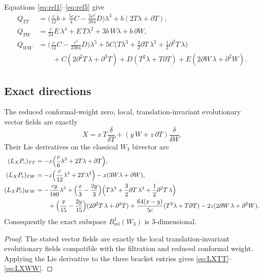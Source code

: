 \begin{remark}
Equations \eqref{eq:rel1}--\eqref{eq:rel5} give
\begin{align*}
Q_{TT}
&=
\Big(\frac c{12}b+\frac{5c}{4}C-\frac{5c^2}{384}D\Big)\lambda^3+b(2T\lambda+\partial T),\\[4pt]
Q_{TW}
&=
\frac c{24}E\,\lambda^4+E\,T\lambda^2+3b\,W\lambda+b\,\partial W,\\[4pt]
Q_{WW}
&=
\Big(\frac c{12}C-\frac{c^2}{2304}D\Big)\lambda^5
+5C\Big(T\lambda^3+\frac32\partial T\,\lambda^2+\frac12\partial^2T\,\lambda\Big)\\
&\qquad
+C(2\partial^2T\,\lambda+\partial^3T)
+D(T^2\lambda+T\partial T)
+E(2\partial W\,\lambda+\partial^2W).
\end{align*}
\end{remark}

\subsection{Exact directions}

\begin{proposition}\label{prop:W3exacts}
The reduced conformal-weight zero, local, translation-invariant evolutionary vector fields
are exactly
\[
X=x\,T\frac{\delta}{\delta T}+(y\,W+z\,\partial T)\frac{\delta}{\delta W}.
\]
Their Lie derivatives on the classical $W_3$ bivector are
\begin{align}
(L_XP_c)_{TT}
&=
-x\Big(\frac c6\lambda^3+2T\lambda+\partial T\Big),\label{eq:LXTT}\\
(L_XP_c)_{TW}
&=
-z\Big(\frac c{12}\lambda^4+2T\lambda^2\Big)-x(3W\lambda+\partial W),\label{eq:LXTW}\\
(L_XP_c)_{WW}
&=
-\frac{cy}{180}\lambda^5
+\Big(\frac x3-\frac{2y}{3}\Big)
\Big(T\lambda^3+\frac32\partial T\,\lambda^2+\frac12\partial^2T\,\lambda\Big)\notag\\
&\qquad
+\Big(\frac x{15}-\frac{2y}{15}\Big)(2\partial^2T\,\lambda+\partial^3T)
+\frac{64(x-y)}{5c}(T^2\lambda+T\partial T)
-2z(2\partial W\,\lambda+\partial^2W).\label{eq:LXWW}
\end{align}
Consequently the exact subspace $B^1_{\mathrm{rel}}(W_3)$ is $3$-dimensional.
\end{proposition}

\begin{proof}
The stated vector fields are exactly the local translation-invariant evolutionary fields
compatible with the filtration and reduced conformal weight. Applying the Lie derivative
to the three bracket entries gives \eqref{eq:LXTT}--\eqref{eq:LXWW}.
\end{proof}

